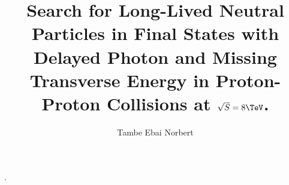 \phd. %
\title{\bf Search for Long-Lived Neutral Particles in Final States with Delayed Photon and Missing Transverse Energy in Proton-Proton Collisions at $\sqrt{S} = 8\TeV$.}
\author{Tambe Ebai Norbert}


\copyrightpage %

\abstract{}

\acknowledgements{}
\dedication{}


\beforepreface 

\figurespage
\tablespage

\afterpreface            
